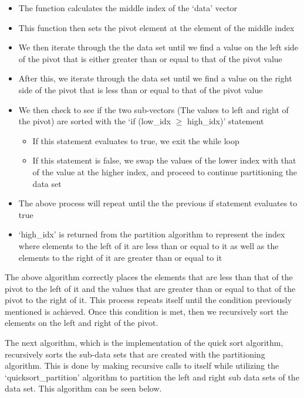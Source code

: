 \begin{highlight}
\begin{itemize}
    \item The function calculates the middle index of the `data' vector
    \item This function then sets the pivot element at the element of the middle index
    \item We then iterate through the the data set until we find a value on the left side of the pivot that is either greater than or equal to that of the pivot value
    \item After this, we iterate through the data set until we find a value on the right side of the pivot that is less than or equal to that of the pivot value
    \item We then check to see if the two sub-vectors (The values to left and right of the pivot) are sorted with the `if (low\_idx $\geq$ high\_idx)' statement
    \begin{itemize}
        \item If this statement evaluates to true, we exit the while loop
        \item If this statement is false, we swap the values of the lower index with that of the value at the higher index, and proceed to continue partitioning the data set
    \end{itemize}
    \item The above process will repeat until the the previous if statement evaluates to true
    \item `high\_idx' is returned from the partition algorithm to represent the index where elements to the left of it are less than or equal to it as well as the elements to the right of it are greater than or equal to it
\end{itemize}

\noindent The above algorithm correctly places the elements that are less than that of the pivot to the left of it and the values that are greater than or equal to that of the pivot
to the right of it. This process repeats itself until the condition previously mentioned is achieved. Once this condition is met, then we recursively sort the elements on the left and right of the pivot.

\end{highlight}

The next algorithm, which is the implementation of the quick sort algorithm, recursively sorts the sub-data sets that are created with the partitioning algorithm. This is done
by making recursive calls to itself while utilizing the `quicksort\_partition' algorithm to partition the left and right sub data sets of the data set. This algorithm can be seen below.

